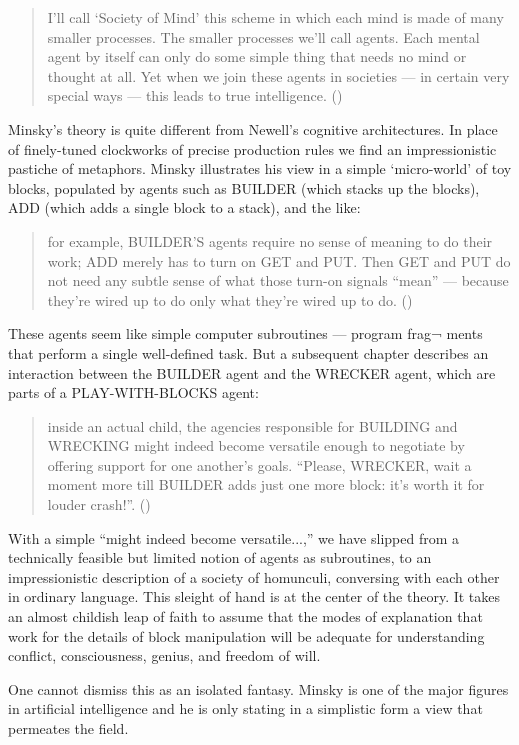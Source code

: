 \documentclass[12pt]{article}
\def\bq{\begin{quote}}
\def\eq{\end{quote}}
\begin{document}
\bq
I'll call `Society of Mind' this scheme in which each mind is made of many smaller processes. The smaller processes we'll call agents. Each mental agent by itself can only do some simple thing that needs no mind or thought at all. Yet when we join these agents in societies --- in certain very special ways --- this leads to true intelligence. ({\cite{minsky1986}})
\eq

Minsky's theory is quite different from Newell's cognitive architectures. In place of finely-tuned clockworks of precise production rules we find an impressionistic pastiche of metaphors. Minsky illustrates his view in a simple `micro-world' of toy blocks, populated by agents such as BUILDER (which stacks up the blocks), ADD (which adds a single block to a stack), and the like:

\bq
for example, BUILDER'S agents require no sense of meaning to do their work; ADD merely has to turn on GET and PUT. Then GET and PUT do not need any subtle sense of what those turn-on signals ``mean'' --- because they're wired up to do only what they're wired up to do. ({\it \cite{minsky1986}})
\eq

These agents seem like simple computer subroutines --- program frag¬ ments that perform a single well-defined task. But a subsequent chapter describes an interaction between the BUILDER agent and the WRECKER agent, which are parts of a PLAY-WITH-BLOCKS agent:

\bq
inside an actual child, the agencies responsible for BUILDING and WRECKING might indeed become versatile enough to negotiate by offering support for one another's goals. ``Please, WRECKER, wait a moment more till BUILDER adds just one more block: it's worth it for louder crash!''. ({\it \cite{minsky1986}})
\eq

With a simple ``might indeed become versatile...,'' we have slipped from a technically feasible but limited notion of agents as subroutines, to an impressionistic description of a society of homunculi, conversing with each other in ordinary language. This sleight of hand is at the center of the theory. It takes an almost childish leap of faith to assume that the modes of
explanation that work for the details of block manipulation will be adequate for understanding conflict, consciousness, genius, and freedom of will.

One cannot dismiss this as an isolated fantasy. Minsky is one of the major figures in artificial intelligence and he is only stating in a simplistic form a view that permeates the field.
\end{document}
